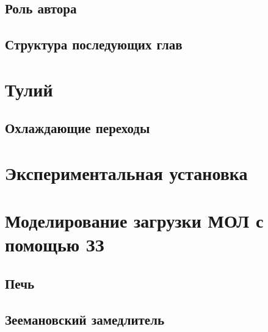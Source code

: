 \subsection{Роль автора}


\subsection{Структура последующих глав}




\unewpage
\section{Тулий} \label{sec:Tm}



\subsection{Охлаждающие переходы}






\unewpage
\section{Экспериментальная установка} \label{sec:EE}







\unewpage
\section{Моделирование загрузки МОЛ с помощью ЗЗ} \label{sec:mMOT}



\subsection{Печь}



\subsection{Зеемановский замедлитель} 



